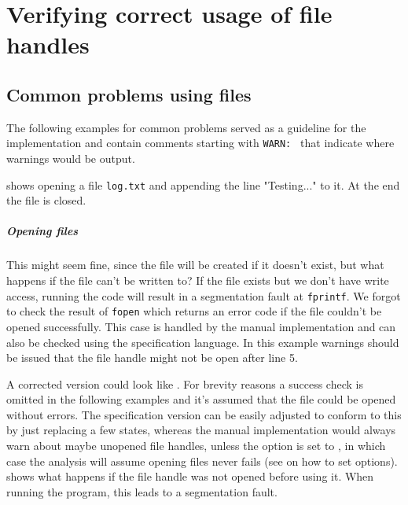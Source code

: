 \chapter{Verifying correct usage of file handles}
\label{chap:file}
\section{Common problems using files}
The following examples for common problems served as a guideline for the implementation and contain comments starting with \verb|WARN: | that indicate where warnings would be output.

 shows opening a file \verb|log.txt| and appending the line "Testing..." to it. At the end the file is closed.

\paragraph*{Opening files}
This might seem fine, since the file will be created if it doesn't exist, but what happens if the file can't be written to?
If the file exists but we don't have write access, running the code will result in a segmentation fault at \verb|fprintf|.
We forgot to check the result of \verb|fopen| which returns an error code if the file couldn't be opened successfully.
This case is handled by the manual implementation and can also be checked using the specification language. In this example warnings should be issued that the file handle might not be open after line 5.

A corrected version could look like .
For brevity reasons a success check is omitted in the following examples and it's assumed that the file could be opened without errors. The specification version can be easily adjusted to conform to this by just replacing a few states, whereas the manual implementation would always warn about maybe unopened file handles, unless the option  is set to , in which case the analysis will assume opening files never fails (see  on how to set options).
 shows what happens if the file handle was not opened before using it. When running the program, this leads to a segmentation fault.

